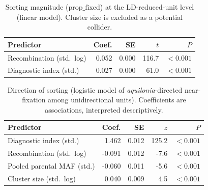 \begin{table}[htbp]
\centering
\small
\caption{Sorting magnitude ($\mathrm{prop\_fixed}$) at the LD-reduced-unit level (linear model). Cluster size is excluded as a potential collider.}
\label{tab:magnitude}
\begin{tabular}{l r r r r}
\toprule
Predictor & Coef. & SE & $t$ & $P$ \\
\midrule
Recombination (std.\ log) & 0.052 & 0.000 & 116.7 & $<0.001$ \\
Diagnostic index (std.) & 0.027 & 0.000 & 61.0 & $<0.001$ \\
\bottomrule
\end{tabular}
\end{table}

\begin{table}[htbp]
\centering
\small
\caption{Direction of sorting (logistic model of \emph{aquilonia}-directed near-fixation among unidirectional units). Coefficients are associations, interpreted descriptively.}
\label{tab:direction}
\begin{tabular}{l r r r r}
\toprule
Predictor & Coef. & SE & $z$ & $P$ \\
\midrule
Diagnostic index (std.) & 1.462 & 0.012 & 125.2 & $<0.001$ \\
Recombination (std.\ log) & -0.091 & 0.012 & -7.6 & $<0.001$ \\
Pooled parental MAF (std.) & -0.060 & 0.011 & -5.6 & $<0.001$ \\
Cluster size (std.\ log) & 0.040 & 0.009 & 4.5 & $<0.001$ \\
\bottomrule
\end{tabular}
\end{table}
